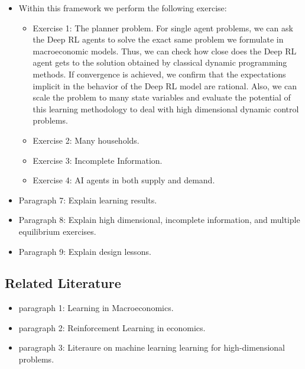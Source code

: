 \documentclass[11pt,english]{article}
\begin{document}
\begin{itemize}
	\item Within this framework we perform the following exercise:
	
	\begin{itemize} 
		\item Exercise 1: The planner problem. For single agent problems, we can ask the Deep RL agents to solve the exact same problem we formulate in macroeconomic models. Thus, we can check how close does the Deep RL agent gets to the solution obtained by classical dynamic programming methods. If convergence is achieved, we confirm that the expectations implicit in the behavior of the Deep RL model are rational. Also, we can scale the problem to many state variables and evaluate the potential of this learning methodology to deal with high dimensional dynamic control problems. \medskip
		
		\item Exercise 2: Many households. \medskip
		
		\item Exercise 3: Incomplete Information. \medskip
		
		\item Exercise 4: AI agents in both supply and demand. \medskip
		
		
		
		
	
	\end{itemize}

	
	\item Paragraph 7: Explain learning results.
	
	\item Paragraph 8: Explain high dimensional, incomplete information, and multiple equilibrium exercises.
	
	\item Paragraph 9: Explain design lessons.
	
\end{itemize}
	
	\subsection{Related Literature}
	
	\begin{itemize}
		\item paragraph 1: Learning in Macroeconomics. \medskip
		
		\item paragraph 2: Reinforcement Learning in economics. \medskip
		
		\item paragraph 3: Literaure on machine learning learning for high-dimensional problems.
	\end{itemize}
	
\end{document}
